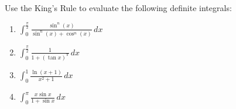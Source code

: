 \documentclass[../main.tex]{subfiles}
\begin{document}
Use the King's Rule to evaluate the following definite integrals:

\begin{enumerate}[itemsep=0.7cm]
    \item 
    $\int_0^{\frac{\pi}{2}}\frac{\sin^n{(x)}}{\sin^n{(x)}+\cos^n{(x)}}\,dx$

    \item 
    $\int_0^{\frac{\pi}{2}}\frac{1}{1+(\tan{x})^{\pi}}\,dx$

    \item 
    $\int_0^1 \frac{\ln{(x+1)}}{x^2+1}\,dx$

    \item 
    $\int_0^{\pi} \frac{x\sin{x}}{1+\sin{x}}\,dx$


\end{enumerate}


\pagebreak
\end{document}
